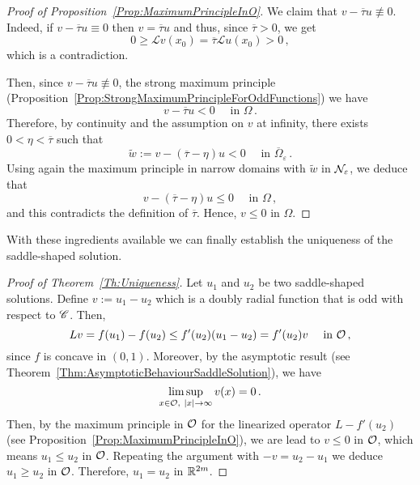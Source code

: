 \begin{proof}[Proof of Proposition~\ref{Prop:MaximumPrincipleInO}]
	We claim that $v - \overline{\tau} u \not \equiv 0$. Indeed, if $v - \overline{\tau} u \equiv 0$ then $v = \overline{\tau} u$ and thus, since $\overline{\tau} > 0$, we get
	$$
	0 \geq \mathscr{L} v(x_0) = \overline{\tau} \mathscr{L} u(x_0) > 0\,, 
	$$
	which is a contradiction.
	
	Then, since $v - \overline{\tau} u \not \equiv 0$, the strong maximum principle (Proposition~\ref{Prop:StrongMaximumPrincipleForOddFunctions}) we have
	$$
	v - \overline{\tau} u < 0 \quad \textrm{ in }\Omega\,.
	$$
	Therefore, by continuity and the assumption on $v$ at infinity, there exists $0 < \eta <\overline{\tau}$ such that 
	$$
	\tilde{w} := v - (\overline{\tau} - \eta) u < 0 \quad \textrm{ in }\overline{\Omega}_\varepsilon\,.
	$$
	Using again the maximum principle in narrow domains with $\tilde{w}$ in $\mathcal{N}_\varepsilon$, we deduce that 
	$$
	v - (\overline{\tau} - \eta) u \leq 0 \quad \textrm{ in }\Omega\,,
	$$
	and this contradicts the definition of $\overline{\tau}$. Hence, $v\leq 0$ in $\Omega$.
\end{proof}



With these ingredients available we can finally establish the uniqueness of the saddle-shaped solution.



\begin{proof}[Proof of Theorem~\ref{Th:Uniqueness}]
	Let $u_1$ and $u_2$ be two saddle-shaped solutions. Define $v := u_1 - u_2$ which is a doubly radial function that is odd with respect to $\mathscr{C}$. Then,
	$$
	L v = f(u_1) - f(u_2) \leq f'(u_2) (u_1 - u_2) = f'(u_2) v \quad \textrm{ in } \mathcal{O}\,,
	$$
	since $f$ is concave in $(0,1)$. Moreover, by the asymptotic result (see Theorem~\ref{Thm:AsymptoticBehaviourSaddleSolution}), we have
	$$
	\limsup_{x\in \mathcal{O}, \ |x|\to \infty} v(x) = 0\,.
	$$
	Then, by the maximum principle in $\mathcal{O}$ for the linearized operator $L - f'(u_2)$ (see Proposition~\ref{Prop:MaximumPrincipleInO}), we are lead to $v \leq 0$ in $\mathcal{O}$, which means $u_1 \leq u_2$ in $\mathcal{O}$. Repeating the  argument with $-v = u_2 - u_1$ we deduce $u_1 \geq u_2$ in $\mathcal{O}$. Therefore, $u_1 = u_2$ in $\mathbb{R}^{2m}$.
\end{proof}


